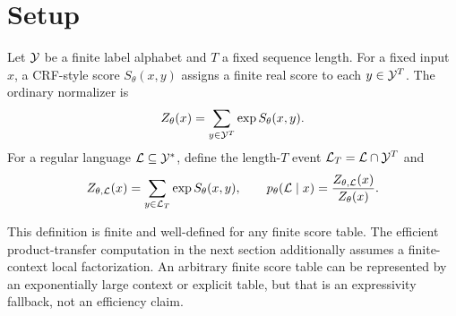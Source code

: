 \section{Setup}

Let \(\mathcal{Y}\) be a finite label alphabet and \(T\) a fixed sequence length.  For a
fixed input \(x\), a CRF-style score \(S_{\theta}(x,y)\) assigns a finite real
score to each \(y \in \mathcal{Y}^T\).  The ordinary normalizer is
\[
  Z_{\theta}(x) = \sum_{y \in \mathcal{Y}^T} \exp S_{\theta}(x,y).
\]
For a regular language \(\mathcal{L} \subseteq \mathcal{Y}^*\), define the length-\(T\) event
\(\mathcal{L}_T = \mathcal{L} \cap \mathcal{Y}^T\) and
\[
  Z_{\theta,\mathcal{L}}(x)
  = \sum_{y \in \mathcal{L}_T} \exp S_{\theta}(x,y),
  \qquad
  p_{\theta}(\mathcal{L} \mid x)
  = \frac{Z_{\theta,\mathcal{L}}(x)}{Z_{\theta}(x)}.
\]

This definition is finite and well-defined for any finite score table.  The
efficient product-transfer computation in the next section additionally assumes
a finite-context local factorization.  An arbitrary finite score table can be
represented by an exponentially large context or explicit table, but that is an
expressivity fallback, not an efficiency claim.
